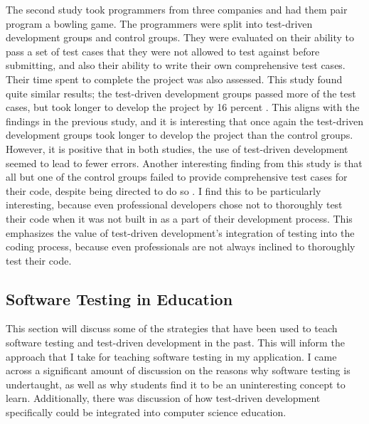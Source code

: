 \documentclass[10pt,twocolumn]{article}
\begin{document}
The second study took programmers from three companies and had them pair program a bowling game. The programmers were 
split into test-driven development groups and control groups. They were evaluated on their ability to pass a set of test 
cases that they were not allowed to test against before submitting, and also their ability to write their own comprehensive test cases. 
Their time spent to complete the project was also assessed. This study found quite similar results; the test-driven 
development groups passed more of the test cases, but took longer to develop the project by 16 percent 
\cite{George2004Article}. This aligns with the findings in the previous study, and it is interesting that once again the 
test-driven development groups took longer to develop the project than the control groups. However, it is positive that
in both studies, the use of test-driven development seemed to lead to fewer errors. Another interesting finding from this 
study is that all but one of the control groups failed to provide comprehensive test cases for their code, despite being 
directed to do so \cite{George2004Article}. I find this to be particularly interesting, because even professional 
developers chose not to thoroughly test their code when it was not built in as a part of their development process. This 
emphasizes the value of test-driven development's integration of testing into the coding process, because even 
professionals are not always inclined to thoroughly test their code. 

\subsection{Software Testing in Education} 

This section will discuss some of the strategies that have been used to teach software testing and test-driven 
development in the past. This will inform the approach that I take for teaching software testing in my application. 
I came across a significant amount of discussion on the reasons why software testing is undertaught, as well as why 
students find it to be an uninteresting concept to learn. Additionally, there was discussion of how test-driven 
development specifically could be integrated into computer science education. 
\end{document}
